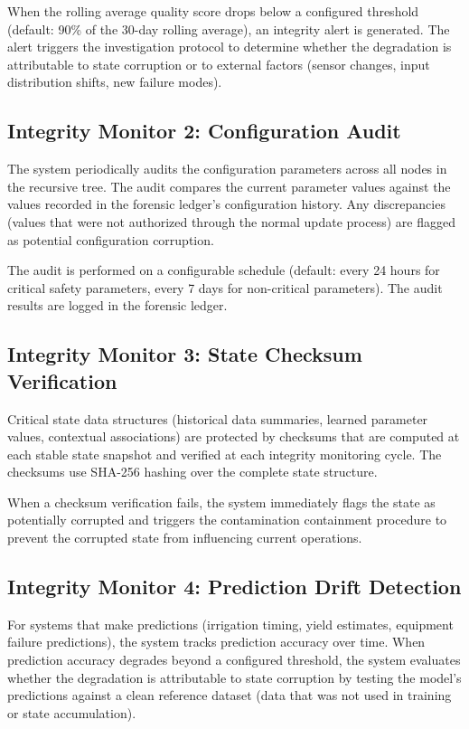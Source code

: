 \documentclass[12pt]{article}
\begin{document}
When the rolling average quality score drops below a configured threshold (default: 90\% of the 30-day rolling average), an integrity alert is generated. The alert triggers the investigation protocol to determine whether the degradation is attributable to state corruption or to external factors (sensor changes, input distribution shifts, new failure modes).

\subsection{Integrity Monitor 2: Configuration Audit}
The system periodically audits the configuration parameters across all nodes in the recursive tree. The audit compares the current parameter values against the values recorded in the forensic ledger's configuration history. Any discrepancies (values that were not authorized through the normal update process) are flagged as potential configuration corruption.

The audit is performed on a configurable schedule (default: every 24 hours for critical safety parameters, every 7 days for non-critical parameters). The audit results are logged in the forensic ledger.

\subsection{Integrity Monitor 3: State Checksum Verification}
Critical state data structures (historical data summaries, learned parameter values, contextual associations) are protected by checksums that are computed at each stable state snapshot and verified at each integrity monitoring cycle. The checksums use SHA-256 hashing over the complete state structure.

When a checksum verification fails, the system immediately flags the state as potentially corrupted and triggers the contamination containment procedure to prevent the corrupted state from influencing current operations.

\subsection{Integrity Monitor 4: Prediction Drift Detection}
For systems that make predictions (irrigation timing, yield estimates, equipment failure predictions), the system tracks prediction accuracy over time. When prediction accuracy degrades beyond a configured threshold, the system evaluates whether the degradation is attributable to state corruption by testing the model's predictions against a clean reference dataset (data that was not used in training or state accumulation).
\end{document}
